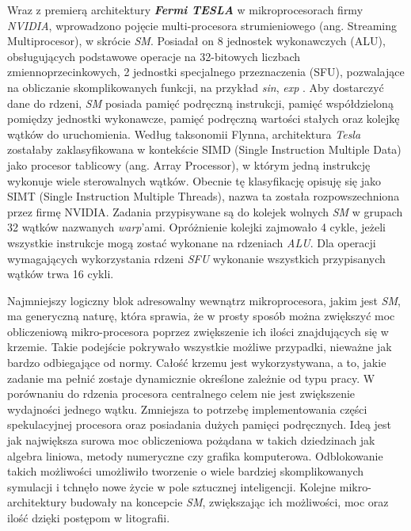 Wraz z premierą architektury \textbf{\textit{Fermi TESLA}} w mikroprocesorach firmy \textit{NVIDIA}, wprowadzono pojęcie multi-procesora strumieniowego (ang. Streaming Multiprocesor), w skrócie \textit{SM}.
Posiadał on 8 jednostek wykonawczych (ALU), obsługujących podstawowe operacje na 32-bitowych liczbach zmiennoprzecinkowych, 2 jednostki specjalnego przeznaczenia (SFU), pozwalające na obliczanie skomplikowanych funkcji, na przykład \textit{sin}, \textit{exp} \cite{TeslaNV}.
Aby dostarczyć dane do rdzeni, \textit{SM} posiada pamięć podręczną instrukcji, pamięć współdzieloną pomiędzy jednostki wykonawcze, pamięć podręczną wartości stałych oraz kolejkę wątków do uruchomienia.
Według taksonomii Flynna, architektura \textit{Tesla} zostałaby zaklasyfikowana w kontekście SIMD (Single Instruction Multiple Data) jako procesor tablicowy (ang. Array Processor)\cite{Flynn72}, w którym jedną instrukcję wykonuje wiele sterowalnych wątków.
Obecnie tę klasyfikację opisuję się jako SIMT (Single Instruction Multiple Threads), nazwa ta została rozpowszechniona przez firmę NVIDIA.
Zadania przypisywane są do kolejek wolnych \textit{SM} w grupach 32 wątków nazwanych \textit{warp}'ami.
Opróżnienie kolejki zajmowało 4 cykle, jeżeli wszystkie instrukcje mogą zostać wykonane na rdzeniach \textit{ALU}.
Dla operacji wymagających wykorzystania rdzeni \textit{SFU} wykonanie wszystkich przypisanych wątków trwa 16 cykli.

Najmniejszy logiczny blok adresowalny wewnątrz mikroprocesora, jakim jest \textit{SM}, ma generyczną naturę, która sprawia, że w prosty sposób można zwiększyć moc obliczeniową mikro-procesora poprzez zwiększenie ich ilości znajdujących się w krzemie.
Takie podejście pokrywało wszystkie możliwe przypadki, nieważne jak bardzo odbiegające od normy.
Całość krzemu jest wykorzystywana, a to, jakie zadanie ma pełnić zostaje dynamicznie określone zależnie od typu pracy. 
W porównaniu do rdzenia procesora centralnego celem nie jest zwiększenie wydajności jednego wątku.
Zmniejsza to potrzebę implementowania części spekulacyjnej procesora oraz posiadania dużych pamięci podręcznych.
Ideą jest jak największa surowa moc obliczeniowa pożądana w takich dziedzinach jak algebra liniowa, metody numeryczne czy grafika komputerowa.
Odblokowanie takich możliwości umożliwiło tworzenie o wiele bardziej skomplikowanych symulacji i tchnęło nowe życie w pole sztucznej inteligencji.
Kolejne mikro-architektury budowały na koncepcie \textit{SM}, zwiększając ich możliwości, moc oraz ilość dzięki postępom w litografii.

